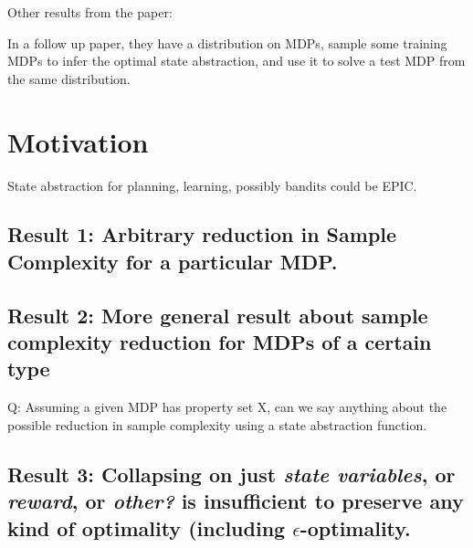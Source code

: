 \documentclass[11pt]{amsart}
\begin{document}
Other results from the paper:





In a follow up paper, they have a distribution on MDPs, sample some training MDPs to infer the optimal state abstraction, and use it to solve a test MDP from the same distribution.



\newpage
\section{Motivation}

 State abstraction for planning, learning, possibly bandits could be EPIC.

\subsection{Result 1: Arbitrary reduction in Sample Complexity for a particular MDP.}

\subsection{Result 2: More general result about sample complexity reduction for MDPs of a certain type}

Q: Assuming a given MDP has property set X, can we say anything about the possible reduction in sample complexity using a state abstraction function.




\subsection{Result 3: Collapsing on just {\it state variables}, or {\it reward}, or {\it other?} is insufficient to preserve any kind of optimality (including $\epsilon$-optimality.}
\end{document}
